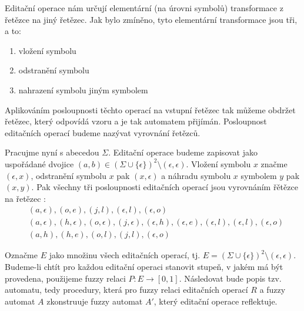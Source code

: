 \documentclass[a4paper,10pt]{article}
\begin{document}
Editační operace nám určují elementární (na úrovni symbolů) transformace z řetězce na jiný řetězec. Jak bylo zmíněno, tyto elementární transformace jsou tři, a to:
\begin{enumerate}
 \item vložení symbolu
 \item odstranění symbolu
 \item nahrazení symbolu jiným symbolem
\end{enumerate}

Aplikováním posloupnosti těchto operací na vstupní řetězec tak můžeme obdržet řetězec, který odpovídá vzoru a je tak automatem přijímán. Posloupnost editačních operací budeme nazývat vyrovnání řetězců.

Pracujme nyní s abecedou $\Sigma$. Editační operace budeme zapisovat jako uspořádané dvojice $(a, b) \in (\Sigma \cup \{ \epsilon \})^2 \setminus (\epsilon, \epsilon)$. Vložení symbolu $x$ značme $(\epsilon, x)$, odstranění symbolu $x$ pak $(x, \epsilon)$ a náhradu symbolu $x$ symbolem $y$ pak $(x, y)$.  Pak všechny tři posloupnosti editačních operací jsou vyrovnáním řětězce  na řetězec :
\begin{align*}
 & (a,\epsilon), (o,e), (j,l), (\epsilon,l), (\epsilon, o) \\
 & (a, \epsilon), (h,\epsilon), (o,\epsilon), (j,\epsilon), (\epsilon,h), (\epsilon,e), (\epsilon,l), (\epsilon,l), (\epsilon,o) \\
 & (a,h), (h,e), (o,l), (j,l), (\epsilon,o) 
\end{align*}

Označme $E$ jako množinu všech editačních operací, tj. $E = (\Sigma \cup \{ \epsilon \})^2 \setminus (\epsilon, \epsilon)$. Budeme-li chtít pro každou editační operaci stanovit stupeň, v jakém má být provedena, použijeme fuzzy relaci  $P: E \rightarrow [0, 1]$. Následovat bude popis tzv.  automatu, tedy procedury, která pro fuzzy relaci editačních operací $R$ a fuzzy automat $A$ zkonstruuje fuzzy automat $A'$, který editační operace reflektuje.
\end{document}
